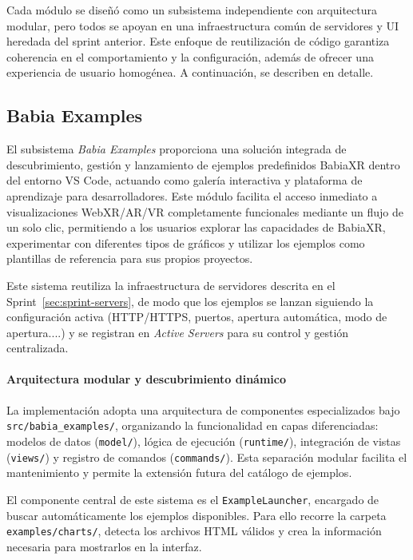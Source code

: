 \documentclass[a4paper, 12pt]{book}
\begin{document}
Cada módulo se diseñó como un subsistema independiente con arquitectura modular, pero todos se apoyan en una infraestructura común de servidores y UI heredada del sprint anterior. Este enfoque de reutilización de código garantiza coherencia en el comportamiento y la configuración, además de ofrecer una experiencia de usuario homogénea. A continuación, se describen en detalle.




\subsection{Babia Examples}
\label{sec:babia-examples}

El subsistema \emph{Babia Examples} proporciona una solución integrada de descubrimiento, gestión y lanzamiento de ejemplos predefinidos BabiaXR dentro del entorno VS Code, actuando como galería interactiva y plataforma de aprendizaje para desarrolladores. Este módulo facilita el acceso inmediato a visualizaciones WebXR/AR/VR completamente funcionales mediante un flujo de un solo clic, permitiendo a los usuarios explorar las capacidades de BabiaXR, experimentar con diferentes tipos de gráficos y utilizar los ejemplos como plantillas de referencia para sus propios proyectos.

Este sistema reutiliza la infraestructura de servidores descrita en el Sprint~\ref{sec:sprint-servers}, de modo que los ejemplos se lanzan siguiendo la configuración activa (HTTP/HTTPS, puertos, apertura automática, modo de apertura....) y se registran en \emph{Active Servers} para su control y gestión centralizada.

\paragraph{Arquitectura modular y descubrimiento dinámico}
La implementación adopta una arquitectura de componentes especializados bajo \texttt{src/babia\_examples/}, organizando la funcionalidad en capas diferenciadas: modelos de datos (\texttt{model/}), lógica de ejecución (\texttt{runtime/}), integración de vistas (\texttt{views/}) y registro de comandos (\texttt{commands/}). Esta separación modular facilita el mantenimiento y permite la extensión futura del catálogo de ejemplos.

El componente central de este sistema es el \texttt{ExampleLauncher}, encargado de buscar automáticamente los ejemplos disponibles. Para ello recorre la carpeta \texttt{examples/charts/}, detecta los archivos HTML válidos y crea la información necesaria para mostrarlos en la interfaz.
\end{document}
